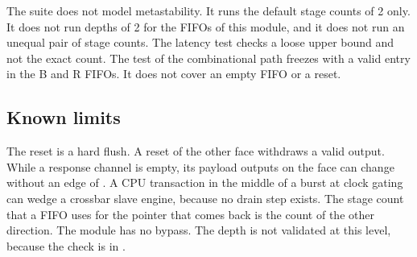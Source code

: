 The suite does not model metastability. It runs the default stage counts of 2 only. It does not run depths of 2 for the FIFOs of this module, and it does not run an unequal pair of stage counts. The latency test checks a loose upper bound and not the exact count. The test of the combinational path freezes  with a valid entry in the B and R FIFOs. It does not cover an empty FIFO or a reset.

\subsection{Known limits}
The reset is a hard flush. A reset of the other face withdraws a valid output. While a response channel is empty, its payload outputs on the  face can change without an edge of . A CPU transaction in the middle of a burst at clock gating can wedge a crossbar slave engine, because no drain step exists. The stage count that a FIFO uses for the pointer that comes back is the count of the other direction. The module has no bypass. The depth is not validated at this level, because the check is in .
